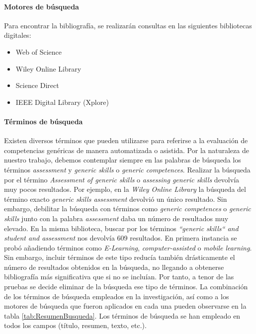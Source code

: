 
\paragraph*{Motores de búsqueda}
\label{sec:MotoresBusqueda}
Para encontrar la bibliografía, se realizarán consultas en las siguientes bibliotecas digitales: 
\begin{itemize}
\item Web of Science
\item Wiley Online Library
\item Science Direct
\item IEEE Digital Library (Xplore)
\end{itemize}

\paragraph*{Términos de búsqueda}
\label{sec:TerminosBusqueda}
Existen diversos términos que pueden utilizarse para referirse a la evaluación de competencias genéricas de manera automatizada o asistida. Por la naturaleza de nuestro trabajo, debemos contemplar siempre en las palabras de búsqueda los términos \emph{assessment} y \emph{generic skills} o \emph{generic competences}. Realizar la búsqueda por el término \emph{Assessment of generic skills} o \emph{assessing generic skills} devolvía muy pocos resultados. Por ejemplo, en la \emph{Wiley Online Library} la búsqueda del término exacto \emph{generic skills assessment} devolvió un único resultado. Sin embargo, debilitar la búsqueda con términos como \emph{generic competences} o \emph{generic skills} junto con la palabra \emph{assessment} daba un número de resultados muy elevado. En la misma biblioteca, buscar por los términos \emph{``generic skills`` and student and assessment} nos devolvía 609 resultados. En primera instancia se probó añadiendo términos como  \emph{E-Learning}, \emph{computer-assisted} o \emph{mobile learning}. Sin embargo, incluir términos de este tipo reducía también drásticamente el número de resultados obtenidos en la búsqueda, no llegando a obtenerse bibliografía más significativa que si no se incluían. Por tanto, a tenor de las pruebas se decide eliminar de la búsqueda ese tipo de términos. La combinación de los términos de búsqueda empleados en la investigación, así como a los motores de búsqueda que fueron aplicados en cada una pueden observarse en la tabla \ref{tab:ResumenBusqueda}. Los términos de búsqueda se han empleado en todos los campos (título, resumen, texto, etc.).

